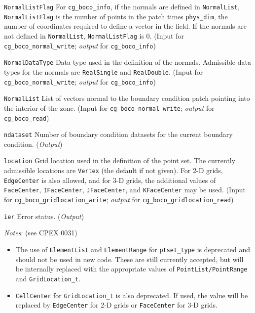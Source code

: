 \begin{Ventryi}{\texttt{NormalListFlag}}
      For \texttt{cg\_boco\_info}, if the normals are defined in
      \texttt{NormalList}, \texttt{NormalListFlag} is the number of points
      in the patch times \texttt{phys\_dim}, the number of coordinates
      required to define a vector in the field.
      If the normals are not defined in \texttt{NormalList},
      \texttt{NormalListFlag} is 0.
      (\textcolor{input}{Input} for \texttt{cg\_boco\_normal\_write};
      \textcolor{output}{\textit{output}} for \texttt{cg\_boco\_info})
\item [\texttt{NormalDataType}]
      Data type used in the definition of the normals.
      Admissible data types for the normals are \texttt{RealSingle} and
      \texttt{RealDouble}.
      (\textcolor{input}{Input} for \texttt{cg\_boco\_normal\_write};
      \textcolor{output}{\textit{output}} for \texttt{cg\_boco\_info})
\item [\texttt{NormalList}]
      List of vectors normal to the boundary condition patch pointing
      into the interior of the zone.
      (\textcolor{input}{Input} for \texttt{cg\_boco\_normal\_write};
      \textcolor{output}{\textit{output}} for \texttt{cg\_boco\_read})
\item [\texttt{ndataset}]
      Number of boundary condition datasets for the current boundary
      condition.
      (\textcolor{output}{\textit{Output}})
\item [\texttt{location}]
      Grid location used in the definition of the point set.
      The currently admissible locations are \texttt{Vertex} (the default
      if not given). For 2-D grids, \texttt{EdgeCenter} is also allowed,
      and for 3-D grids, the additional values of \texttt{FaceCenter},
      \texttt{IFaceCenter}, \texttt{JFaceCenter}, and
      \texttt{KFaceCenter} may be used.
      (\textcolor{input}{Input} for \texttt{cg\_boco\_gridlocation\_write};
      \textcolor{output}{\textit{output}} for
      \texttt{cg\_boco\_gridlocation\_read})
\item [\texttt{ier}]
      Error status.
      (\textcolor{output}{\textit{Output}})
\end{Ventryi}

\noindent
\textit{Notes}: (see CPEX 0031)
\begin{itemize}
\item The use of \texttt{ElementList} and \texttt{ElementRange} for
      \texttt{ptset\_type} is deprecated and should not be used
      in new code. These are still currently accepted, but will be internally
      replaced with the appropriate values of \texttt{PointList/PointRange}
      and \texttt{GridLocation\_t}.
\item \texttt{CellCenter} for \texttt{GridLocation\_t} is also deprecated.
      If used, the value will be replaced by \texttt{EdgeCenter} for
      2-D grids or \texttt{FaceCenter} for 3-D grids.
\end{itemize}

